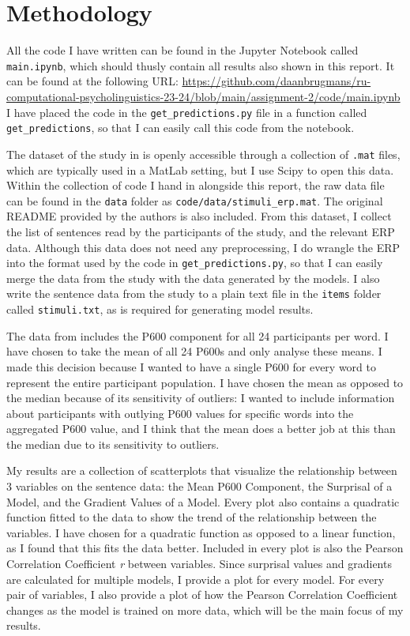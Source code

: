 \documentclass{IEEEtran}
\begin{document}
\section{Methodology}
All the code I have written can be found in the Jupyter Notebook called \texttt{main.ipynb}, which should thusly contain all results also shown in this report.
It can be found at the following URL: \url{https://github.com/daanbrugmans/ru-computational-psycholinguistics-23-24/blob/main/assignment-2/code/main.ipynb}
I have placed the code in the \texttt{get\_predictions.py} file in a function called \texttt{get\_predictions}, so that I can easily call this code from the notebook.

The dataset of the study in \cite{frank2015erp} is openly accessible through a collection of \texttt{.mat} files, which are typically used in a MatLab setting, but I use Scipy to open this data.
Within the collection of code I hand in alongside this report, the raw data file can be found in the \texttt{data} folder as \texttt{code/data/stimuli\_erp.mat}.
The original README provided by the authors is also included.
From this dataset, I collect the list of sentences read by the participants of the study, and the relevant ERP data.
Although this data does not need any preprocessing, I do wrangle the ERP into the format used by the code in \texttt{get\_predictions.py}, so that I can easily merge the data from the study with the data generated by the models.
I also write the sentence data from the study to a plain text file in the \texttt{items} folder called \texttt{stimuli.txt}, as is required for generating model results.

The data from \cite{frank2015erp} includes the P600 component for all 24 participants per word.
I have chosen to take the mean of all 24 P600s and only analyse these means.
I made this decision because I wanted to have a single P600 for every word to represent the entire participant population.
I have chosen the mean as opposed to the median because of its sensitivity of outliers: I wanted to include information about participants with outlying P600 values for specific words into the aggregated P600 value, and I think that the mean does a better job at this than the median due to its sensitivity to outliers.

My results are a collection of scatterplots that visualize the relationship between 3 variables on the sentence data: the Mean P600 Component, the Surprisal of a Model, and the Gradient Values of a Model.
Every plot also contains a quadratic function fitted to the data to show the trend of the relationship between the variables.
I have chosen for a quadratic function as opposed to a linear function, as I found that this fits the data better.
Included in every plot is also the Pearson Correlation Coefficient \textit{r} between variables.
Since surprisal values and gradients are calculated for multiple models, I provide a plot for every model.
For every pair of variables, I also provide a plot of how the Pearson Correlation Coefficient changes as the model is trained on more data, which will be the main focus of my results.
\end{document}
